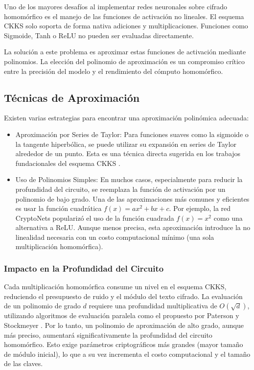 Uno de los mayores desafíos al implementar redes neuronales sobre cifrado homomórfico es el manejo de las funciones de activación no lineales. El esquema CKKS solo soporta de forma nativa adiciones y multiplicaciones. Funciones como Sigmoide, Tanh o ReLU no pueden ser evaluadas directamente.

La solución a este problema es aproximar estas funciones de activación mediante polinomios. La elección del polinomio de aproximación es un compromiso crítico entre la precisión del modelo y el rendimiento del cómputo homomórfico.

\subsection{Técnicas de Aproximación}

Existen varias estrategias para encontrar una aproximación polinómica adecuada:

\begin{itemize}
    \item Aproximación por Series de Taylor: Para funciones suaves como la sigmoide o la tangente hiperbólica, se puede utilizar su expansión en series de Taylor alrededor de un punto. Esta es una técnica directa sugerida en los trabajos fundacionales del esquema CKKS \cite{CKKS17}.

    \item Uso de Polinomios Simples: En muchos casos, especialmente para reducir la profundidad del circuito, se reemplaza la función de activación por un polinomio de bajo grado. Una de las aproximaciones más comunes y eficientes es usar la función cuadrática $f(x) = ax^2 + bx + c$. Por ejemplo, la red CryptoNets \cite{GiladBachrach2016CryptoNets} popularizó el uso de la función cuadrada $f(x) = x^2$ como una alternativa a ReLU. Aunque menos precisa, esta aproximación introduce la no linealidad necesaria con un costo computacional mínimo (una sola multiplicación homomórfica).
\end{itemize}

\subsubsection{Impacto en la Profundidad del Circuito}

Cada multiplicación homomórfica consume un nivel en el esquema CKKS, reduciendo el presupuesto de ruido y el módulo del texto cifrado. La evaluación de un polinomio de grado $d$ requiere una profundidad multiplicativa de $O(\sqrt d)$, utilizando algoritmos de evaluación paralela como el propuesto por Paterson y Stockmeyer \cite{Paterson1973}. Por lo tanto, un polinomio de aproximación de alto grado, aunque más preciso, aumentará significativamente la profundidad del circuito homomórfico. Esto exige parámetros criptográficos más grandes (mayor tamaño de módulo inicial), lo que a su vez incrementa el costo computacional y el tamaño de las claves.

